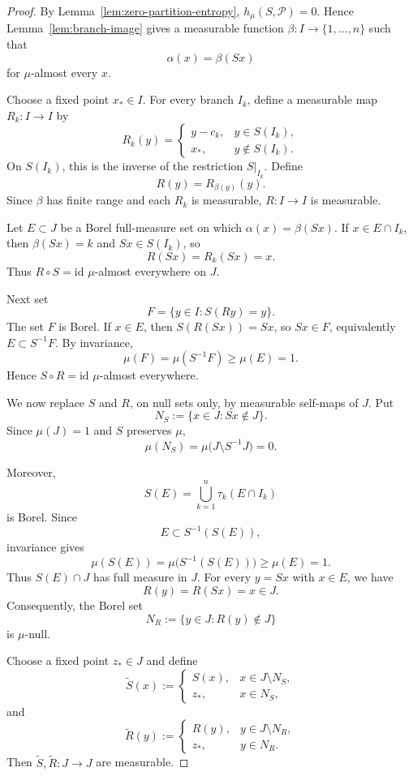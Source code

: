 \documentclass[11pt]{amsart}
\theoremstyle{plain}
\theoremstyle{definition}
\theoremstyle{remark}
\newcommand{\cP}{\mathcal P}
\begin{document}
\begin{proof}
By Lemma~\ref{lem:zero-partition-entropy}, \(h_\mu(S,\cP)=0\). Hence
Lemma~\ref{lem:branch-image} gives a measurable function
\(\beta:I\to\{1,\ldots,n\}\) such that
\[
        \alpha(x)=\beta(Sx)
\]
for \(\mu\)-almost every \(x\).

Choose a fixed point \(x_*\in I\). For every branch \(I_k\), define a measurable map
\(R_k:I\to I\) by
\[
R_k(y)=
\begin{cases}
        y-c_k, & y\in S(I_k),\\
        x_*,   & y\notin S(I_k).
\end{cases}
\]
On \(S(I_k)\), this is the inverse of the restriction \(S|_{I_k}\). Define
\[
        R(y)=R_{\beta(y)}(y).
\]
Since \(\beta\) has finite range and each \(R_k\) is measurable, \(R:I\to I\) is
measurable.

Let \(E\subset J\) be a Borel full-measure set on which
\(\alpha(x)=\beta(Sx)\). If \(x\in E\cap I_k\), then \(\beta(Sx)=k\) and
\(Sx\in S(I_k)\), so
\[
        R(Sx)=R_k(Sx)=x.
\]
Thus \(R\circ S=\mathrm{id}\) \(\mu\)-almost everywhere on \(J\).

Next set
\[
        F=\{y\in I:S(Ry)=y\}.
\]
The set \(F\) is Borel. If \(x\in E\), then
\(S(R(Sx))=Sx\), so \(Sx\in F\), equivalently \(E\subset S^{-1}F\). By
invariance,
\[
        \mu(F)=\mu(S^{-1}F)\geq\mu(E)=1.
\]
Hence \(S\circ R=\mathrm{id}\) \(\mu\)-almost everywhere.

We now replace \(S\) and \(R\), on null sets only, by measurable
self-maps of \(J\). Put
\[
        N_S
        :=
        \{x\in J:Sx\notin J\}.
\]
Since \(\mu(J)=1\) and \(S\) preserves \(\mu\),
\[
        \mu(N_S)
        =
        \mu\bigl(J\setminus S^{-1}J\bigr)
        =
        0.
\]

Moreover,
\[
        S(E)
        =
        \bigcup_{k=1}^{n}\tau_k(E\cap I_k)
\]
is Borel. Since
\[
        E\subset S^{-1}(S(E)),
\]
invariance gives
\[
        \mu(S(E))
        =
        \mu\bigl(S^{-1}(S(E))\bigr)
        \geq
        \mu(E)
        =
        1.
\]
Thus \(S(E)\cap J\) has full measure in \(J\). For every
\(y=Sx\) with \(x\in E\), we have
\[
        R(y)=R(Sx)=x\in J.
\]
Consequently, the Borel set
\[
        N_R
        :=
        \{y\in J:R(y)\notin J\}
\]
is \(\mu\)-null.

Choose a fixed point \(z_*\in J\) and define
\[
        \widetilde S(x)
        :=
        \begin{cases}
        S(x),&x\in J\setminus N_S,\\
        z_*,&x\in N_S,
        \end{cases}
\]
and
\[
        \widetilde R(y)
        :=
        \begin{cases}
        R(y),&y\in J\setminus N_R,\\
        z_*,&y\in N_R.
        \end{cases}
\]
Then \(\widetilde S,\widetilde R:J\to J\) are measurable.


\end{proof}
\end{document}
